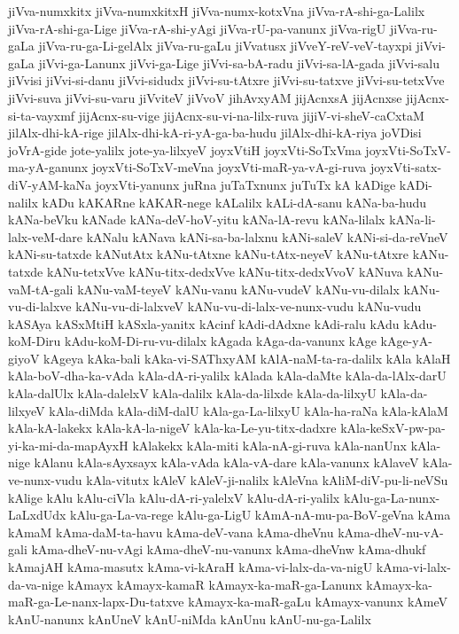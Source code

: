 {jiVva-numxkitx
jiVva-numxkitxH
jiVva-numx-kotxVna
jiVva-rA-shi-ga-Lalilx
jiVva-rA-shi-ga-Lige
jiVva-rA-shi-yAgi
jiVva-rU-pa-vanunx
jiVva-rigU
jiVva-ru-gaLa
jiVva-ru-ga-Li-gelAlx
jiVva-ru-gaLu
jiVvatusx
jiVveY-reV-veV-tayxpi
jiVvi-gaLa
jiVvi-ga-Lanunx
jiVvi-ga-Lige
jiVvi-sa-bA-radu
jiVvi-sa-lA-gada
jiVvi-salu
jiVvisi
jiVvi-si-danu
jiVvi-sidudx
jiVvi-su-tAtxre
jiVvi-su-tatxve
jiVvi-su-tetxVve
jiVvi-suva
jiVvi-su-varu
jiVviteV
jiVvoV
jihAvxyAM
jijAcnxsA
jijAcnxse
jijAcnx-si-ta-vayxmf
jijAcnx-su-vige
jijAcnx-su-vi-na-lilx-ruva
jijiV-vi-sheV-caCxtaM
jilAlx-dhi-kA-rige
jilAlx-dhi-kA-ri-yA-ga-ba-hudu
jilAlx-dhi-kA-riya
joVDisi
joVrA-gide
jote-yalilx
jote-ya-lilxyeV
joyxVtiH
joyxVti-SoTxVma
joyxVti-SoTxV-ma-yA-ganunx
joyxVti-SoTxV-meVna
joyxVti-maR-ya-vA-gi-ruva
joyxVti-satx-diV-yAM-kaNa
joyxVti-yanunx
juRna
juTaTxnunx
juTuTx
kA
kADige
kADi-nalilx
kADu
kAKARne
kAKAR-nege
kALalilx
kALi-dA-sanu
kANa-ba-hudu
kANa-beVku
kANade
kANa-deV-hoV-yitu
kANa-lA-revu
kANa-lilalx
kANa-li-lalx-veM-dare
kANalu
kANava
kANi-sa-ba-lalxnu
kANi-saleV
kANi-si-da-reVneV
kANi-su-tatxde
kANutAtx
kANu-tAtxne
kANu-tAtx-neyeV
kANu-tAtxre
kANu-tatxde
kANu-tetxVve
kANu-titx-dedxVve
kANu-titx-dedxVvoV
kANuva
kANu-vaM-tA-gali
kANu-vaM-teyeV
kANu-vanu
kANu-vudeV
kANu-vu-dilalx
kANu-vu-di-lalxve
kANu-vu-di-lalxveV
kANu-vu-di-lalx-ve-nunx-vudu
kANu-vudu
kASAya
kASxMtiH
kASxla-yanitx
kAcinf
kAdi-dAdxne
kAdi-ralu
kAdu
kAdu-koM-Diru
kAdu-koM-Di-ru-vu-dilalx
kAgada
kAga-da-vanunx
kAge
kAge-yA-giyoV
kAgeya
kAka-bali
kAka-vi-SAThxyAM
kAlA-naM-ta-ra-dalilx
kAla
kAlaH
kAla-boV-dha-ka-vAda
kAla-dA-ri-yalilx
kAlada
kAla-daMte
kAla-da-lAlx-darU
kAla-dalUlx
kAla-dalelxV
kAla-dalilx
kAla-da-lilxde
kAla-da-lilxyU
kAla-da-lilxyeV
kAla-diMda
kAla-diM-dalU
kAla-ga-La-lilxyU
kAla-ha-raNa
kAla-kAlaM
kAla-kA-lakekx
kAla-kA-la-nigeV
kAla-ka-Le-yu-titx-dadxre
kAla-keSxV-pw-pa-yi-ka-mi-da-mapAyxH
kAlakekx
kAla-miti
kAla-nA-gi-ruva
kAla-nanUnx
kAla-nige
kAlanu
kAla-sAyxsayx
kAla-vAda
kAla-vA-dare
kAla-vanunx
kAlaveV
kAla-ve-nunx-vudu
kAla-vitutx
kAleV
kAleV-ji-nalilx
kAleVna
kAliM-diV-pu-li-neVSu
kAlige
kAlu
kAlu-ciVla
kAlu-dA-ri-yalelxV
kAlu-dA-ri-yalilx
kAlu-ga-La-nunx-LaLxdUdx
kAlu-ga-La-va-rege
kAlu-ga-LigU
kAmA-nA-mu-pa-BoV-geVna
kAma
kAmaM
kAma-daM-ta-havu
kAma-deV-vana
kAma-dheVnu
kAma-dheV-nu-vA-gali
kAma-dheV-nu-vAgi
kAma-dheV-nu-vanunx
kAma-dheVnw
kAma-dhukf
kAmajAH
kAma-masutx
kAma-vi-kAraH
kAma-vi-lalx-da-va-nigU
kAma-vi-lalx-da-va-nige
kAmayx
kAmayx-kamaR
kAmayx-ka-maR-ga-Lanunx
kAmayx-ka-maR-ga-Le-nanx-lapx-Du-tatxve
kAmayx-ka-maR-gaLu
kAmayx-vanunx
kAmeV
kAnU-nanunx
kAnUneV
kAnU-niMda
kAnUnu
kAnU-nu-ga-Lalilx
}
